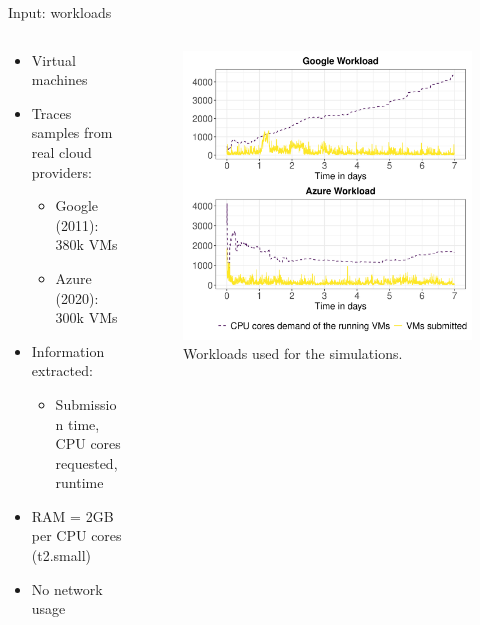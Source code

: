 \documentclass[Ligatures=TeX,table,svgnames,usetotalslideindicator,compress,10pt,aspectratio=169]{beamer}
\begin{document}
\begin{frame}{Input: workloads}

  \begin{columns}
    
    \begin{column}{0.5\textwidth}          
      \begin{itemize}
      \item Virtual machines
      \item Traces samples from real cloud providers:
        \begin{itemize}        
        \item Google (2011): 380k VMs
        \item Azure (2020):  300k VMs
        \end{itemize}
      \item Information extracted:
        \begin{itemize}        
        \item Submission time, CPU cores requested, runtime            
        \end{itemize}              

      \item RAM = 2GB per CPU cores (t2.small)
        \item No network usage
      \end{itemize}
    \end{column}
    
    \begin{column}{0.5\textwidth}
      \begin{figure}[!h]
        \centering
        \includegraphics[width=\textwidth]{images/workloads.png}
        \caption{Workloads used for the simulations.}
      \end{figure}
    \end{column}    
  \end{columns}    
  
\end{frame}
\end{document}

